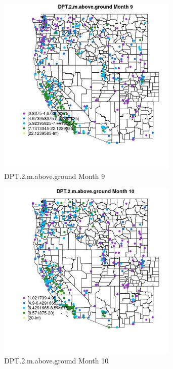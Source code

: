 \begin{figure} 
\centering  
\includegraphics[width=0.77\textwidth]{Code_Outputs/ML_input_report_ML_input_PM25_Step5_part_d_de_duplicated_aves_ML_input_MapObsMo9DPT2maboveground.jpg} 
\caption{\label{fig:ML_input_report_ML_input_PM25_Step5_part_d_de_duplicated_aves_ML_inputMapObsMo9DPT2maboveground}DPT.2.m.above.ground Month 9} 
\end{figure} 
 

\begin{figure} 
\centering  
\includegraphics[width=0.77\textwidth]{Code_Outputs/ML_input_report_ML_input_PM25_Step5_part_d_de_duplicated_aves_ML_input_MapObsMo10DPT2maboveground.jpg} 
\caption{\label{fig:ML_input_report_ML_input_PM25_Step5_part_d_de_duplicated_aves_ML_inputMapObsMo10DPT2maboveground}DPT.2.m.above.ground Month 10} 
\end{figure} 
 


